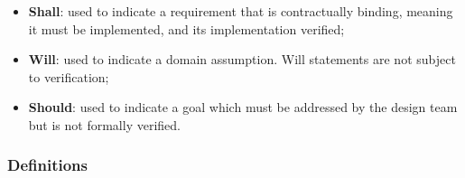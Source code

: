 \begin{itemize}
    \item \textbf{Shall}: used to indicate a requirement that is contractually binding, meaning it must be implemented, and its implementation verified;
    \item \textbf{Will}: used to indicate a domain assumption.  Will statements are not subject to verification;
    \item \textbf{Should}: used to indicate a goal which must be addressed by the design team but is not formally verified.
\end{itemize}

\subsubsection{Definitions}
\label{sec:definitions}
